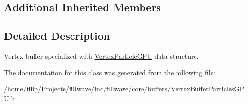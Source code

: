 \subsection*{Additional Inherited Members}


\subsection{Detailed Description}
Vertex buffer specialized with \hyperlink{structfillwave_1_1core_1_1VertexParticleGPU}{Vertex\+Particle\+G\+P\+U} data structure. 

The documentation for this class was generated from the following file\+:\begin{DoxyCompactItemize}
\item 
/home/filip/\+Projects/fillwave/inc/fillwave/core/buffers/Vertex\+Buffer\+Particles\+G\+P\+U.\+h\end{DoxyCompactItemize}
